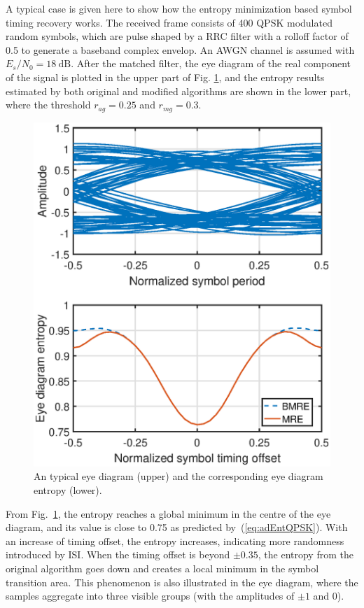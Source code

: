 \documentclass[journal,comsoc,onecolumn, 12pt,draftclsnofoot]{IEEEtran}
\begin{document}
A typical case is given here to show how the entropy minimization based symbol timing recovery works.
The received frame consists of 400 QPSK modulated random symbols, 
which are pulse shaped by a RRC filter with a rolloff factor of 0.5 to generate a baseband complex envelop.
An AWGN channel is assumed with $E_s/N_0 = 18~\text{dB}$. 
After the matched filter, the eye diagram of the real component of the signal is plotted in the upper part of Fig. \ref{fig:timing}, and the entropy results estimated by both original and modified algorithms are shown in the lower part,
where the threshold $r_{ag}=0.25$ and \(r_{mg}=0.3\).

\begin{figure}[htbp]
\centering
\includegraphics[width=3 in]{pic/timing.eps}
\caption{An typical eye diagram (upper) and the corresponding eye diagram entropy (lower).}
\label{fig:timing} 
\end{figure}

From Fig.~\ref{fig:timing}, the entropy reaches a global minimum in the centre of the eye diagram, and its value is close to 0.75 as predicted by~(\ref{eq:adEntQPSK}).
With an increase of timing offset, the entropy increases, indicating  more randomness introduced by ISI.
When the timing offset is beyond $\pm 0.35$, the  entropy from the original algorithm goes down and creates a local minimum in the symbol transition area. 
This phenomenon is also illustrated in the eye diagram, where the samples aggregate into three visible groups (with the amplitudes of \(\pm 1\) and 0).
\end{document}
